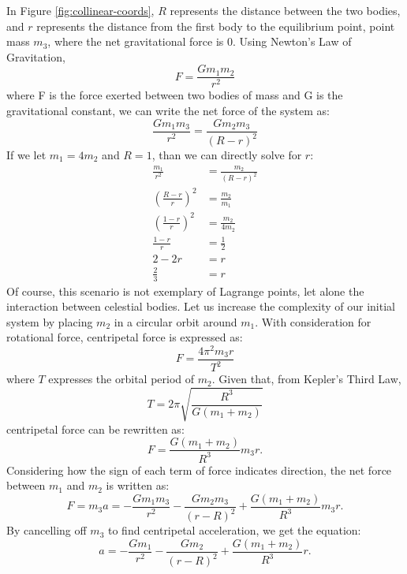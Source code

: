 In Figure \ref{fig:collinear-coords}, $R$ represents the distance between the two bodies, and $r$ represents the distance from the first body to the equilibrium point, point mass $m_3$, where the net gravitational force is 0. Using Newton's Law of Gravitation,
\begin{equation*}
	F = \frac{Gm_1m_2}{r^2}
\end{equation*}
where F is the force exerted between two bodies of mass and G is the gravitational constant, we can write the net force of the system as:
\begin{equation*}
	\frac{Gm_1m_3}{r^2} = \frac{Gm_2m_3}{(R - r)^2}
\end{equation*}
If we let $m_1 = 4m_2$ and $R = 1$, than we can directly solve for $r$:
\begin{align*}
	\frac{m_1}{r^2} &= \frac{m_2}{(R - r)^2} \\
	\left(\frac{R - r}{r}\right)^2 &= \frac{m_2}{m_1} \\
	\left(\frac{1 - r}{r}\right)^2 &= \frac{m_2}{4m_2} \\
	\frac{1 - r}{r} &= \frac{1}{2} \\
	2 - 2r &= r \\
	\frac{2}{3} &= r
\end{align*}
Of course, this scenario is not exemplary of Lagrange points, let alone the interaction between celestial bodies. Let us increase the complexity of our initial system by placing $m_2$ in a circular orbit around $m_1$. With consideration for rotational force, centripetal force is expressed as:
\begin{equation*}
	F = \frac{4\pi^2m_3r}{T^2}
\end{equation*}
where $T$ expresses the orbital period of $m_2$. Given that, from Kepler's Third Law,
\begin{equation*}
	T = 2\pi \sqrt{\frac{R^3}{G(m_1 + m_2)}}
\end{equation*}
centripetal force can be rewritten as:
\begin{equation*}
	F = \frac{G(m_1+m_2)}{R^3}m_3r \text{.}
\end{equation*}
Considering how the sign of each term of force indicates direction, the net force between $m_1$ and $m_2$ is written as:
\begin{equation*}
	F = m_3a = -\frac{Gm_1m_3}{r^2} - \frac{Gm_2m_3}{(r - R)^2} + \frac{G(m_1+m_2)}{R^3}m_3r \text{.}
\end{equation*}
By cancelling off $m_3$ to find centripetal acceleration, we get the equation:
\begin{equation*}
	a = -\frac{Gm_1}{r^2} - \frac{Gm_2}{(r - R)^2} + \frac{G(m_1+m_2)}{R^3}r \text{.}
\end{equation*}
